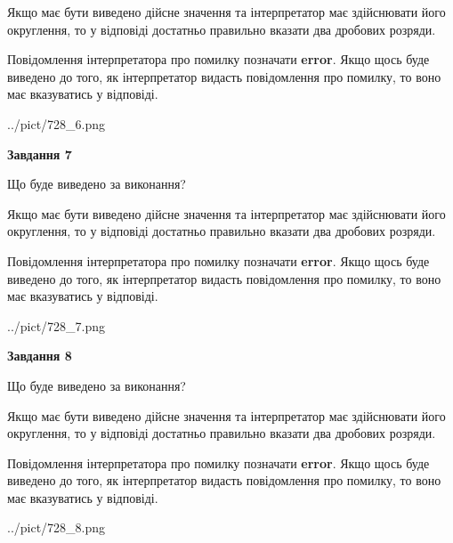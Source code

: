 \documentclass[12pt, ukrainian]{article}
\begin{document}
{\begin {Large}
Якщо має бути виведено дійсне значення та інтерпретатор має здійснювати його округлення, 
то у відповіді достатньо правильно вказати два дробових розряди.

Повідомлення інтерпретатора про помилку позначати \textbf{error}.
Якщо щось буде виведено до того, як інтерпретатор видасть повідомлення про помилку, 
то воно має вказуватись у відповіді. \par

\begin{center}
	{../pict/728_6.png}
\end{center}
\newpage

{\begin {center}\textbf{Завдання 7}\end {center}}\par
Що буде виведено за виконання? \par

Якщо має бути виведено дійсне значення та інтерпретатор має здійснювати його округлення, 
то у відповіді достатньо правильно вказати два дробових розряди.

Повідомлення інтерпретатора про помилку позначати \textbf{error}.
Якщо щось буде виведено до того, як інтерпретатор видасть повідомлення про помилку, 
то воно має вказуватись у відповіді. \par

\begin{center}
	{../pict/728_7.png}
\end{center}
\newpage

{\begin {center}\textbf{Завдання 8}\end {center}}\par
Що буде виведено за виконання? \par

Якщо має бути виведено дійсне значення та інтерпретатор має здійснювати його округлення, 
то у відповіді достатньо правильно вказати два дробових розряди.

Повідомлення інтерпретатора про помилку позначати \textbf{error}.
Якщо щось буде виведено до того, як інтерпретатор видасть повідомлення про помилку, 
то воно має вказуватись у відповіді. \par

\begin{center}
	{../pict/728_8.png}
\end{center}
\newpage


\end{Large}}
\end{document}
